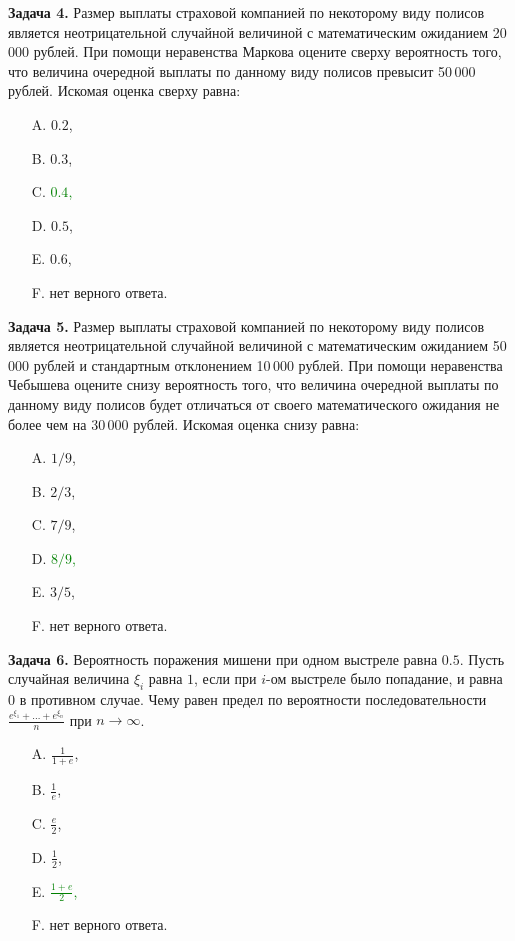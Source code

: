 \documentclass[a4paper, 12pt]{article}
\begin{document}
\medskip

\textbf{Задача 4.} Размер выплаты страховой компанией по некоторому виду полисов является неотрицательной случайной величиной с математическим ожиданием 20\,000 рублей. При помощи неравенства Маркова оцените сверху вероятность того, что величина очередной выплаты по данному виду полисов превысит 50\,000 рублей. Искомая оценка сверху равна:
\begin{itemize}
  \item[A.] $0.2$,
  \item[B.] $0.3$,
  \item[C.] \textcolor{green}{$0.4$,}
  \item[D.] $0.5$,
  \item[E.] $0.6$,
  \item[F.] нет верного ответа.
\end{itemize}


\medskip

\textbf{Задача 5.} Размер выплаты страховой компанией по некоторому виду полисов является неотрицательной случайной величиной с математическим ожиданием 50\,000 рублей и стандартным отклонением 10\,000 рублей. При помощи неравенства Чебышева оцените снизу вероятность того, что величина очередной выплаты по данному виду полисов будет отличаться от своего математического ожидания не более чем на 30\,000 рублей. Искомая оценка снизу равна:
\begin{itemize}
  \item[A.] $1/9$,
  \item[B.] $2/3$,
  \item[C.] $7/9$,
  \item[D.] \textcolor{green}{$8/9$,}
  \item[E.] $3/5$,
  \item[F.] нет верного ответа.
\end{itemize}


\medskip

\textbf{Задача 6.} Вероятность поражения мишени при одном выстреле равна $0.5$. Пусть случайная величина $\xi_i$  равна $1$, если при $i$-ом выстреле было попадание, и равна $0$ в противном случае. Чему равен предел по вероятности последовательности $\frac{e^{\xi_1} + \ldots + e^{\xi_n}}{n}$ при $n \rightarrow \infty$.
\begin{itemize}
  \item[A.] $\frac{1}{1+e}$,
  \item[B.] $\frac{1}{e}$,
  \item[C.] $\frac{e}{2}$,
  \item[D.] $\frac{1}{2}$,
  \item[E.] \textcolor{green}{$\frac{1+e}{2}$,}
  \item[F.] нет верного ответа.
\end{itemize}
\end{document}
